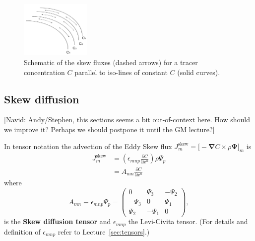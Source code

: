 \begin{figure}[h]
\centering
\includegraphics[width=0.3\textwidth]{figures/Lecture4_fig2.png}
\caption{Schematic of the skew fluxes (dashed arrows) for a tracer concentration $C$ parallel to iso-lines of constant $C$ (solid curves).}
\label{fig:skewF}
\end{figure}
 
 \subsection{Skew diffusion}
 {\color{red}[Navid: Andy/Stephen, this sections seems a bit out-of-context here. How should we improve it? Perhaps we should postpone it until the GM lecture?]}

 In tensor notation the advection of the Eddy Skew flux $J^{\textrm{skew}}_m = \big[ -\boldsymbol{\nabla} C \times \rho \boldsymbol{\Psi}\big]_m$ is          
\begin{align}
    J^{\textrm{skew}} _m &= \left( \epsilon_{mnp} \frac{\partial C}{\partial x^n}\right)\rho \Psi_p \\
    & = A_{mn} \frac{\partial C}{\partial x^n}
\end{align}
where
\begin{equation}
A_{mn} \equiv \epsilon_{mnp} \Psi_p = \begin{pmatrix}
                                    0 & \Psi_3 & -\Psi_2\\
                                    -\Psi_3 & 0 & \Psi_1\\
                                    \Psi_2 & -\Psi_1 & 0
                                \end{pmatrix},
\end{equation}
is the \textbf{Skew diffusion tensor} and $\epsilon_{mnp}$ the Levi-Civita tensor. (For details and definition of $\epsilon_{mnp}$ refer to Lecture~\ref{sec:tensors}.)